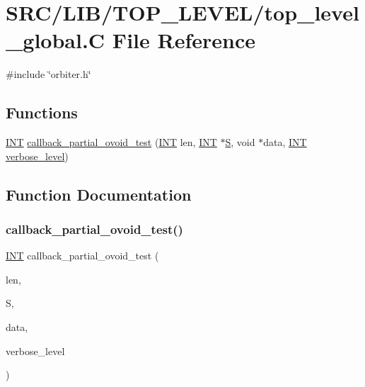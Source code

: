 \hypertarget{top__level__global_8_c}{}\section{S\+R\+C/\+L\+I\+B/\+T\+O\+P\+\_\+\+L\+E\+V\+E\+L/top\+\_\+level\+\_\+global.C File Reference}
\label{top__level__global_8_c}
{\ttfamily \#include \char`\"{}orbiter.\+h\char`\"{}}\newline
\subsection*{Functions}
\begin{DoxyCompactItemize}
\item 
\mbox{\hyperlink{galois_8h_a09fddde158a3a20bd2dcadb609de11dc}{I\+NT}} \mbox{\hyperlink{top__level__global_8_c_a727820f93ffbddb54e384905b4661761}{callback\+\_\+partial\+\_\+ovoid\+\_\+test}} (\mbox{\hyperlink{galois_8h_a09fddde158a3a20bd2dcadb609de11dc}{I\+NT}} len, \mbox{\hyperlink{galois_8h_a09fddde158a3a20bd2dcadb609de11dc}{I\+NT}} $\ast$\mbox{\hyperlink{simeon_8_c_adab47f8243f1b5a2c31df2535d6b37d0}{S}}, void $\ast$data, \mbox{\hyperlink{galois_8h_a09fddde158a3a20bd2dcadb609de11dc}{I\+NT}} \mbox{\hyperlink{simeon_8_c_a818073fbcc2f439e7c56952f67386122}{verbose\+\_\+level}})
\end{DoxyCompactItemize}


\subsection{Function Documentation}
\mbox{\label{top__level__global_8_c_a727820f93ffbddb54e384905b4661761}} 
\subsubsection{\texorpdfstring{callback\+\_\+partial\+\_\+ovoid\+\_\+test()}{callback\_partial\_ovoid\_test()}}
{\footnotesize\ttfamily \mbox{\hyperlink{galois_8h_a09fddde158a3a20bd2dcadb609de11dc}{I\+NT}} callback\+\_\+partial\+\_\+ovoid\+\_\+test (\begin{DoxyParamCaption}\item[{\mbox{\hyperlink{galois_8h_a09fddde158a3a20bd2dcadb609de11dc}{I\+NT}}}]{len,  }\item[{\mbox{\hyperlink{galois_8h_a09fddde158a3a20bd2dcadb609de11dc}{I\+NT}} $\ast$}]{S,  }\item[{void $\ast$}]{data,  }\item[{\mbox{\hyperlink{galois_8h_a09fddde158a3a20bd2dcadb609de11dc}{I\+NT}}}]{verbose\+\_\+level }\end{DoxyParamCaption})}

